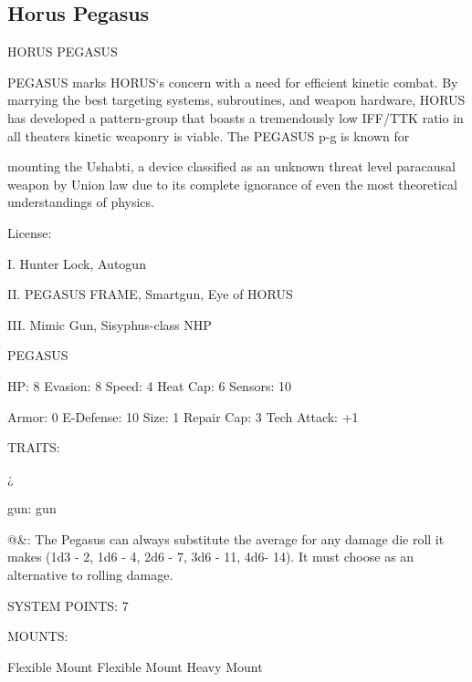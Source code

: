 \subsection{Horus Pegasus}

                                         HORUS PEGASUS  

PEGASUS marks HORUS‘s concern with a need for efficient kinetic combat. By marrying the best targeting  
systems, subroutines, and weapon hardware, HORUS has developed a pattern-group that boasts a  
tremendously low IFF/TTK ratio in all theaters kinetic weaponry is viable. The PEGASUS p-g is known for  

mounting the Ushabti, a device classified as an unknown threat level paracausal weapon by Union law due  
to its complete ignorance of even the most theoretical understandings of physics.  

                                                  License:
 
I. Hunter Lock, Autogun
 
II. PEGASUS FRAME, Smartgun, Eye of HORUS
 
III. Mimic Gun, Sisyphus-class NHP
 

                                                                                                           


                                                    PEGASUS 

  HP: 8           Evasion: 8                              Speed: 4            Heat Cap: 6         Sensors: 10 

  Armor: 0        E-Defense: 10                           Size: 1             Repair Cap: 3       Tech Attack:  
                                                                                                  +1 

                                                      TRAITS: 

  ¿%
 
  gun: gun
 
  @\&: The Pegasus can always substitute the average for any damage die roll it makes  (1d3 - 2, 1d6 - 4,  
  2d6 - 7, 3d6 - 11, 4d6- 14). It must choose as an alternative to rolling damage. 

                                                SYSTEM POINTS: 7 

                                                     MOUNTS: 

  Flexible Mount                      Flexible Mount                          Heavy Mount 

